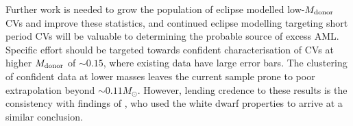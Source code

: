 Further work is needed to grow the population of eclipse modelled low-$M_{\rm donor}$ CVs and improve these statistics, and continued eclipse modelling targeting short period CVs will be valuable to determining the probable source of excess AML.
Specific effort should be targeted towards confident characterisation of CVs at higher $M_{\rm donor}$ of $\sim0.15$, where existing data have large error bars. The clustering of confident data at lower masses leaves the current sample prone to poor extrapolation beyond $\sim 0.11 M_\odot$.
However, lending credence to these results is the consistency with findings of \citet{Pala2021}, who used the white dwarf properties to arrive at a similar conclusion.

